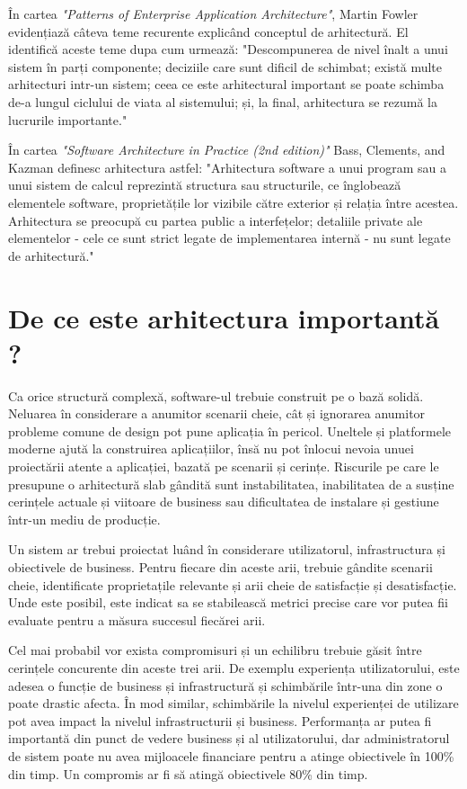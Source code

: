 \documentclass[12pt, a4paper, oneside, romanian]{teza-upb}
\begin{document}
În cartea \emph{"Patterns of Enterprise Application Architecture"}, Martin Fowler evidențiază câteva teme recurente explicând conceptul de arhitectură. El identifică aceste teme dupa cum urmează: "Descompunerea de nivel înalt a unui sistem în parți componente; deciziile care sunt dificil de schimbat; există multe arhitecturi intr-un sistem; ceea ce este arhitectural important se poate schimba de-a lungul ciclului de viata al sistemului; și, la final, arhitectura se rezumă la lucrurile importante."

În cartea \emph{"Software Architecture in Practice (2nd edition)"} Bass, Clements, and Kazman definesc arhitectura astfel: "Arhitectura software a unui program sau a unui sistem de calcul reprezintă structura sau structurile, ce înglobează elementele software, proprietățile lor vizibile către exterior și relația între acestea. Arhitectura se preocupă cu partea public a interfețelor; detaliile private ale elementelor - cele ce sunt strict legate de implementarea internă - nu sunt legate de arhitectură."

\newpage
\section{De ce este arhitectura importantă ?}
Ca orice structură complexă, software-ul trebuie construit pe o bază solidă. Neluarea în considerare a anumitor scenarii cheie, cât și ignorarea anumitor probleme comune de design pot pune aplicația în pericol. Uneltele și platformele moderne ajută la construirea aplicațiilor, însă nu pot înlocui nevoia unuei proiectării atente a aplicației, bazată pe scenarii și cerințe. Riscurile pe care le presupune o arhitectură slab gândită sunt instabilitatea, inabilitatea de a susține cerințele actuale și viitoare de business sau dificultatea de instalare și gestiune într-un mediu de producție.

Un sistem ar trebui proiectat luând în considerare utilizatorul, infrastructura și obiectivele de business. Pentru fiecare din aceste arii, trebuie gândite scenarii cheie, identificate proprietațile relevante și arii cheie de satisfacție și desatisfacție. Unde este posibil, este indicat sa se stabilească metrici precise care vor putea fii evaluate pentru a măsura succesul fiecărei arii.

Cel mai probabil vor exista compromisuri și un echilibru trebuie găsit între cerințele concurente din aceste trei arii. De exemplu experiența utilizatorului, este adesea o funcție de business și infrastructură și schimbările într-una din zone o poate drastic afecta. În mod similar, schimbările la nivelul experienței de utilizare pot avea impact la nivelul infrastructurii și business. Performanța ar putea fi importantă din punct de vedere business și al utilizatorului, dar administratorul de sistem poate nu avea mijloacele financiare pentru a atinge obiectivele în 100\% din timp. Un compromis ar fi să atingă obiectivele 80\% din timp.
\end{document}
